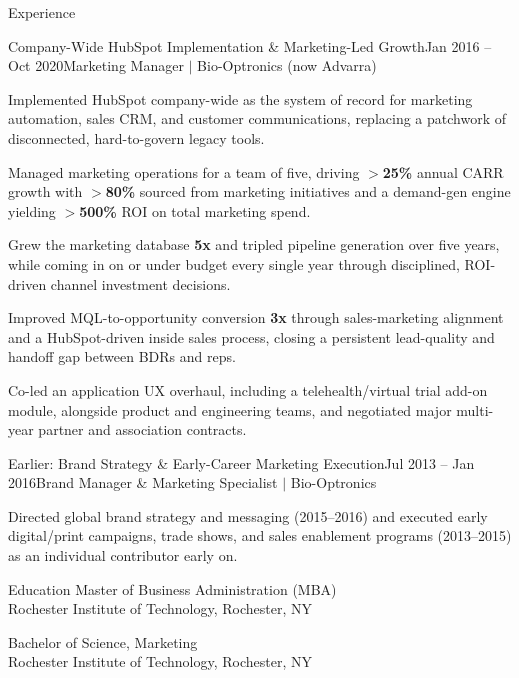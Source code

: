 \documentclass{resume}
\begin{document}
\begin{rSection}{Experience}
\begin{rSubsection}{Company-Wide HubSpot Implementation \& Marketing-Led Growth}{\textcolor{black!60}{Jan 2016 -- Oct 2020}}{Marketing Manager $\vert$ Bio-Optronics (now Advarra)}{}
\item Implemented HubSpot company-wide as the system of record for marketing automation, sales CRM, and customer communications, replacing a patchwork of disconnected, hard-to-govern legacy tools.
\item Managed marketing operations for a team of five, driving \textbf{$>$25\%} annual CARR growth with \textbf{$>$80\%} sourced from marketing initiatives and a demand-gen engine yielding \textbf{$>$500\%} ROI on total marketing spend.
\item Grew the marketing database \textbf{5x} and tripled pipeline generation over five years, while coming in on or under budget every single year through disciplined, ROI-driven channel investment decisions.
\item Improved MQL-to-opportunity conversion \textbf{3x} through sales-marketing alignment and a HubSpot-driven inside sales process, closing a persistent lead-quality and handoff gap between BDRs and reps.
\item Co-led an application UX overhaul, including a telehealth/virtual trial add-on module, alongside product and engineering teams, and negotiated major multi-year partner and association contracts.
\end{rSubsection}

\begin{rSubsection}{Earlier: Brand Strategy \& Early-Career Marketing Execution}{\textcolor{black!60}{Jul 2013 -- Jan 2016}}{Brand Manager \& Marketing Specialist $\vert$ Bio-Optronics}{}
\item Directed global brand strategy and messaging (2015--2016) and executed early digital/print campaigns, trade shows, and sales enablement programs (2013--2015) as an individual contributor early on.
\end{rSubsection}

\end{rSection}
\vspace{-0.15cm}


\begin{rSection}{Education}
{Master of Business Administration (MBA)} \hfill {\textcolor{black!60}{}}\\
{Rochester Institute of Technology}, Rochester, NY

{Bachelor of Science, Marketing} \hfill {\textcolor{black!60}{}}\\
{Rochester Institute of Technology}, Rochester, NY
\end{rSection}
\end{document}
